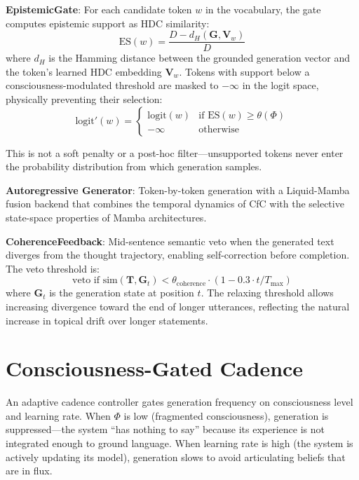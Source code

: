 \documentclass[12pt]{book}
\begin{document}
\textbf{EpistemicGate}: For each candidate token $w$ in the vocabulary, the gate computes epistemic support as HDC similarity:
\begin{equation}\label{eq:epistemic-gate}
\text{ES}(w) = \frac{D - d_H(\mathbf{G}, \mathbf{V}_w)}{D}
\end{equation}
where $d_H$ is the Hamming distance between the grounded generation vector and the token's learned HDC embedding $\mathbf{V}_w$. Tokens with support below a consciousness-modulated threshold are masked to $-\infty$ in the logit space, physically preventing their selection:
\begin{equation}
\text{logit}'(w) = \begin{cases}
\text{logit}(w) & \text{if } \text{ES}(w) \geq \theta(\Phi) \\
-\infty & \text{otherwise}
\end{cases}
\end{equation}

This is not a soft penalty or a post-hoc filter---unsupported tokens never enter the probability distribution from which generation samples.

\textbf{Autoregressive Generator}: Token-by-token generation with a Liquid-Mamba fusion backend that combines the temporal dynamics of CfC with the selective state-space properties of Mamba architectures.

\textbf{CoherenceFeedback}: Mid-sentence semantic veto when the generated text diverges from the thought trajectory, enabling self-correction before completion. The veto threshold is:
\begin{equation}
\text{veto if } \text{sim}(\mathbf{T}, \mathbf{G}_t) < \theta_{\text{coherence}} \cdot (1 - 0.3 \cdot t / T_{\text{max}})
\end{equation}
where $\mathbf{G}_t$ is the generation state at position $t$. The relaxing threshold allows increasing divergence toward the end of longer utterances, reflecting the natural increase in topical drift over longer statements.

\section{Consciousness-Gated Cadence}

An adaptive cadence controller gates generation frequency on consciousness level and learning rate. When $\Phi$ is low (fragmented consciousness), generation is suppressed---the system ``has nothing to say'' because its experience is not integrated enough to ground language. When learning rate is high (the system is actively updating its model), generation slows to avoid articulating beliefs that are in flux.
\end{document}
